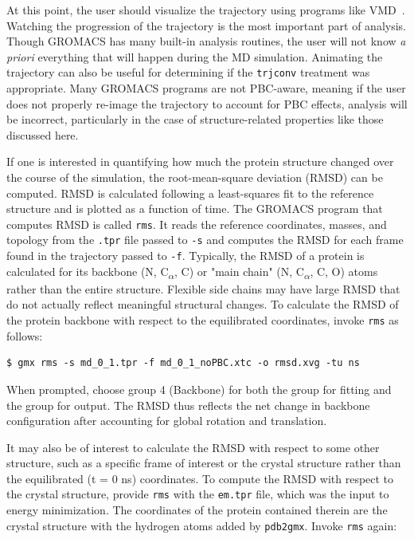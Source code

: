 \documentclass[9pt,tutorial,pubversion]{livecoms}
\begin{document}
At this point, the user should visualize the trajectory using programs like VMD~\cite{Humphrey1996}. Watching the progression of the trajectory is the most important part of analysis. Though GROMACS has many built-in analysis routines, the user will not know {\em a priori} everything that will happen during the MD simulation. Animating the trajectory can also be useful for determining if the \texttt{trjconv} treatment was appropriate. Many GROMACS programs are not PBC-aware, meaning if the user does not properly re-image the trajectory to account for PBC effects, analysis will be incorrect, particularly in the case of structure-related properties like those discussed here.

If one is interested in quantifying how much the protein structure changed over the course of the simulation, the root-mean-square deviation (RMSD) can be computed. RMSD is calculated following a least-squares fit to the reference structure and is plotted as a function of time. The GROMACS program that computes RMSD is called \texttt{rms}. It reads the reference coordinates, masses, and topology from the \texttt{.tpr} file passed to \texttt{-s} and computes the RMSD for each frame found in the trajectory passed to \texttt{-f}. Typically, the RMSD of a protein is calculated for its backbone (N, C\textsubscript{$\alpha$}, C) or "main chain" (N, C\textsubscript{$\alpha$}, C, O) atoms rather than the entire structure. Flexible side chains may have large RMSD that do not actually reflect meaningful structural changes. To calculate the RMSD of the protein backbone with respect to the equilibrated coordinates, invoke \texttt{rms} as follows:

\begin{lstlisting}
$ gmx rms -s md_0_1.tpr -f md_0_1_noPBC.xtc -o rmsd.xvg -tu ns
\end{lstlisting}

When prompted, choose group 4 (Backbone) for both the group for fitting and the group for output. The RMSD thus reflects the net change in backbone configuration after accounting for global rotation and translation.

It may also be of interest to calculate the RMSD with respect to some other structure, such as a specific frame of interest or the crystal structure rather than the equilibrated (t = 0 ns) coordinates. To compute the RMSD with respect to the crystal structure, provide \texttt{rms} with the \texttt{em.tpr} file, which was the input to energy minimization. The coordinates of the protein contained therein are the crystal structure with the hydrogen atoms added by \texttt{pdb2gmx}. Invoke \texttt{rms} again:
\end{document}
